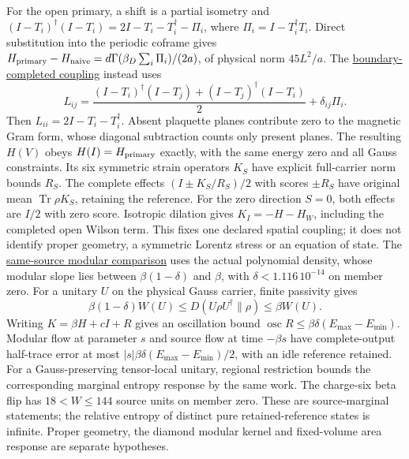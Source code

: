 For the open primary, a shift is a partial isometry and
$(I-T_i)^\dagger(I-T_i)=2I-T_i-T_i^\dagger-\Pi_i$,
where $\Pi_i=I-T_i^\dagger T_i$. Direct substitution into the periodic
coframe gives $H_{\rm primary}-H_{\rm naive}
=d\Gamma(\beta_D\sum_i\Pi_i)/(2a)$, of physical norm $45L^2/a$.
The \href{https://github.com/FloatingPragma/observer-patch-holography/blob/main/model/particle_primary_open_coframe/PROOF.md}{boundary-completed coupling}
instead uses
\[
 L_{ij}=\frac{(I-T_i)^\dagger(I-T_j)+(I-T_j)^\dagger(I-T_i)}2
           +\delta_{ij}\Pi_i.
\]
Then $L_{ii}=2I-T_i-T_i^\dagger$. Absent plaquette planes contribute
zero to the magnetic Gram form, whose diagonal subtraction counts only
present planes. The resulting $H(V)$ obeys $H(I)=H_{\rm primary}$
exactly, with the same energy zero and all Gauss constraints. Its six
symmetric strain operators $K_S$ have explicit full-carrier norm bounds
$R_S$. The complete effects $(I\pm K_S/R_S)/2$ with scores $\pm R_S$
have original mean $\operatorname{Tr}\rho K_S$, retaining the reference.
For the zero direction $S=0$, both effects are $I/2$ with zero score. Isotropic dilation
gives $K_I=-H-H_W$, including the completed open Wilson term.
This fixes one declared spatial coupling; it does not identify proper
geometry, a symmetric Lorentz stress or an equation of state.
The \href{https://github.com/FloatingPragma/observer-patch-holography/blob/main/model/particle_primary_gravity_premises/PROOF.md}{same-source modular comparison}
uses the actual polynomial density, whose modular slope lies
between $\beta(1-\delta)$ and $\beta$, with $\delta<1.116\,10^{-14}$
on member zero. For a unitary $U$ on the physical Gauss carrier, finite
passivity gives
\[
 \beta(1-\delta)W(U)\le D(U\rho U^\dagger\|\rho)
                         \le\beta W(U).
\]
Writing $K=\beta H+cI+R$ gives an oscillation bound
$\operatorname{osc}R\le\beta\delta(E_{\max}-E_{\min})$.
Modular flow at parameter $s$ and source flow at time $-\beta s$ have
complete-output half-trace error at most
$|s|\beta\delta(E_{\max}-E_{\min})/2$, with an idle reference retained.
For a Gauss-preserving tensor-local unitary, regional restriction bounds
the corresponding marginal entropy response by the same work. The
charge-six beta flip has $18<W\le144$ source units on member zero.
These are source-marginal statements; the relative entropy of distinct
pure retained-reference states is infinite. Proper geometry, the diamond
modular kernel and fixed-volume area response are separate hypotheses.

